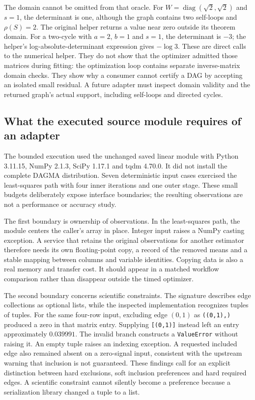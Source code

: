 The domain cannot be omitted from that oracle. For
$W=\operatorname{diag}(\sqrt{2},\sqrt{2})$ and $s=1$, the determinant is
one, although the graph contains two self-loops and $\rho(S)=2$.
The original helper returns a value near zero outside its theorem domain.
For a two-cycle with $a=2$, $b=1$ and $s=1$, the determinant is $-3$;
the helper's log-absolute-determinant expression gives $-\log3$.
These are direct calls to the numerical helper. They do not show that the
optimizer admitted those matrices during fitting: the optimization loop
contains separate inverse-matrix domain checks. They show why a consumer
cannot certify a DAG by accepting an isolated small residual. A future
adapter must inspect domain validity and the returned graph's actual support,
including self-loops and directed cycles.
\citep{exec16_dagma_primary,exec16_dagma_exact}

\subsection{What the executed source module requires of an adapter}

The bounded execution used the unchanged saved linear module with Python
3.11.15, NumPy 2.1.3, SciPy 1.17.1 and tqdm 4.70.0. It did not install the
complete DAGMA distribution. Seven deterministic input cases exercised the
least-squares path with four inner iterations and one outer stage. These
small budgets deliberately expose interface boundaries; the resulting
observations are not a performance or accuracy study.
\citep{exec16_dagma_runtime}

The first boundary is ownership of observations. In the least-squares path,
the module centers the caller's array in place. Integer input raises a
NumPy casting exception. A service that retains the original observations
for another estimator therefore needs its own floating-point copy, a record
of the removed means and a stable mapping between columns and variable
identities. Copying data is also a real memory and transfer cost. It should
appear in a matched workflow comparison rather than disappear outside the
timed optimizer.
\citep{exec16_dagma_primary,exec16_dagma_runtime}

The second boundary concerns scientific constraints. The signature describes
edge collections as optional lists, while the inspected implementation
recognizes tuples of tuples. For the same four-row input, excluding edge
$(0,1)$ as \texttt{((0,1),)} produced a zero in that matrix entry. Supplying
\texttt{[(0,1)]} instead left an entry approximately $0.039991$.
The invalid branch constructs a \texttt{ValueError} without raising it.
An empty tuple raises an indexing exception. A requested included edge also
remained absent on a zero-signal input, consistent with the upstream warning
that inclusion is not guaranteed. These findings call for an explicit
distinction between hard exclusions, soft inclusion preferences and hard
required edges. A scientific constraint cannot silently become a preference
because a serialization library changed a tuple to a list.
\citep{exec16_dagma_primary,exec16_dagma_runtime}

